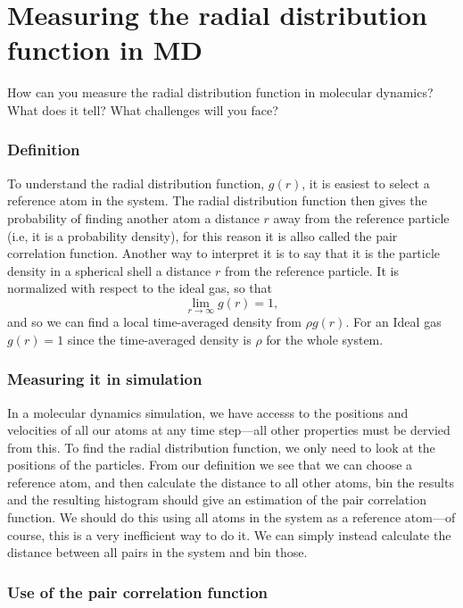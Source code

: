 \documentclass[a4paper, 11pt, notitlepage, english]{article}
\begin{document}
\clearpage



\section{Measuring the radial distribution function in MD}
How can you measure the radial distribution function in molecular dynamics? What does it tell? What challenges will you face?

\subsubsection*{Definition}

To understand the radial distribution function, $g(r)$, it is easiest to select a reference atom in the system. The radial distribution function then gives the probability of finding another atom a distance $r$ away from the reference particle (i.e, it is a probability density), for this reason it is allso called the pair correlation function. Another way to interpret it is to say that it is the particle density in a spherical shell a distance $r$ from the reference particle. It is normalized with respect to the ideal gas, so that
$$\lim_{r \to \infty} g(r) = 1,$$
and so we can find a local time-averaged density from $\rho g(r)$. For an Ideal gas $g(r) = 1$ since the time-averaged density is $\rho$ for the whole system.

\subsubsection*{Measuring it in simulation}

In a molecular dynamics simulation, we have accesss to the positions and velocities of all our atoms at any time step---all other properties must be dervied from this. To find the radial distribution function, we only need to look at the positions of the particles. From our definition we see that we can choose a reference atom, and then calculate the distance to all other atoms, bin the results and the resulting histogram should give an estimation of the pair correlation function. We should do this using all atoms in the system as a reference atom---of course, this is a very inefficient way to do it. We can simply instead calculate the distance between all pairs in the system and bin those. 
\subsubsection*{Use of the pair correlation function}
\end{document}
